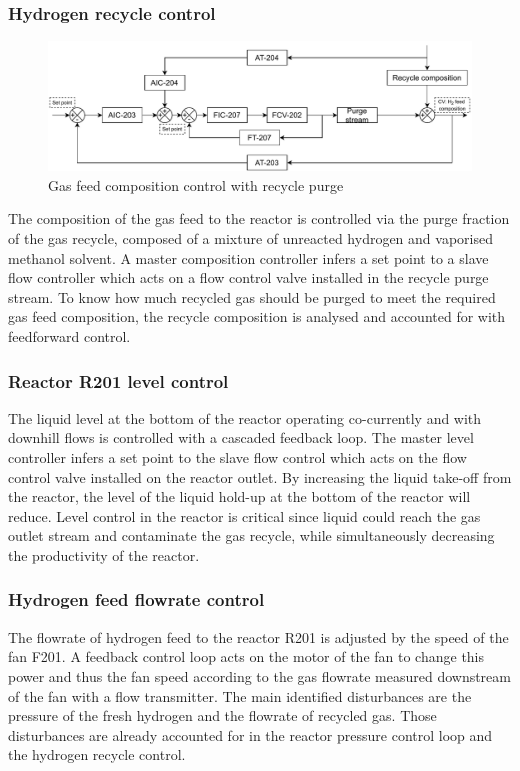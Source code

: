 \subsubsection{Hydrogen recycle control}%
\begin{figure}
    \centering
    \includegraphics[width=\linewidth]{chapters/4-operation-control/4-Figures/V202-CC.pdf}
    \caption{Gas feed composition control with recycle purge}
    \label{fig:V202-CC}
\end{figure}
The composition of the gas feed to the reactor is controlled via the purge fraction of the gas recycle, composed of a mixture of unreacted hydrogen and vaporised methanol solvent. A master composition controller infers a set point to a slave flow controller which acts on a flow control valve installed in the recycle purge stream. To know how much recycled gas should be purged to meet the required gas feed composition, the recycle composition is analysed and accounted for with feedforward control. 



\subsubsection{Reactor R201 level control} %
The liquid level at the bottom of the reactor operating co-currently and with downhill flows is controlled with a cascaded feedback loop. The master level controller infers a set point to the slave flow control which acts on the flow control valve installed on the reactor outlet. By increasing the liquid take-off from the reactor, the level of the liquid hold-up at the bottom of the reactor will reduce. Level control in the reactor is critical since liquid could reach the gas outlet stream and contaminate the gas recycle, while simultaneously decreasing the productivity of the reactor.


\subsubsection{Hydrogen feed flowrate control} %
The flowrate of hydrogen feed to the reactor R201 is adjusted by the speed of the fan F201. A feedback control loop acts on the motor of the fan to change this power and thus the fan speed according to the gas flowrate measured downstream of the fan with a flow transmitter. The main identified disturbances are the pressure of the fresh hydrogen and the flowrate of recycled gas. Those disturbances are already accounted for in the reactor pressure control loop and the hydrogen recycle control. 




